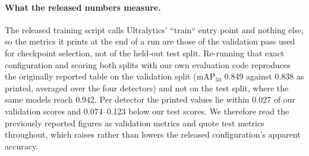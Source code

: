 \paragraph{What the released numbers measure.} The released training script calls
Ultralytics' ``train`` entry point and nothing else, so the metrics it prints at the end of
a run are those of the validation pass used for checkpoint selection, not of the held-out
test split. Re-running that exact configuration and scoring both splits with our own
evaluation code reproduces the originally reported table on the validation split (mAP$_{50}$
0.849 against 0.838 as printed, averaged over the four detectors) and not on the test split,
where the same models reach 0.942. Per detector the printed values lie within 0.027 of our
validation scores and 0.074--0.123 below our test scores. We therefore read the previously
reported figures as validation metrics and quote test metrics throughout, which raises
rather than lowers the released configuration's apparent accuracy.
